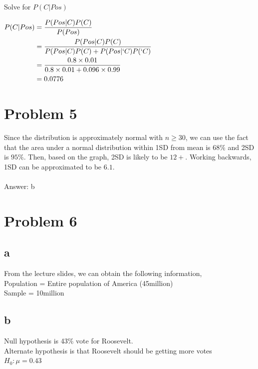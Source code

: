 \documentclass[12pt]{article}
\begin{document}
Solve for $P(C|Pos)$

\begin{center}
    $
        \begin{alignedat}{1}
            P(C|Pos) & = \frac{P (Pos|C) P (C)}{P (Pos)}\\
                     & =\frac{P (Pos|C) P (C)}{P (Pos|C) P (C) + P (Pos|`C) P (`C)}\\
                     & =\frac{0.8 \times0.01}{0.8 \times0.01 + 0.096 \times0.99} \\
                     & =0.0776
        \end{alignedat}
    $
\end{center}

\newpage

\section*{Problem 5}

Since the distribution is approximately normal with $n \geq 30$, we can
use the fact that the area under a normal distribution within 1SD
from mean is $68\%$ and 2SD is $95\%$. Then, based on the graph, 2SD is
likely to be $12+$. Working backwards, 1SD can be approximated to be $6.1$.
\\\\
Answer: b

\newpage

\section*{Problem 6}

\subsection*{a}
From the lecture slides, we can obtain the following information,\\
Population = Entire population of America (45million)\\
Sample = 10million

\subsection*{b}

Null hypothesis is 43\% vote for Roosevelt.\\
Alternate hypothesis is that Roosevelt should be getting more votes\\

$H_0: \mu=0.43$
\end{document}
